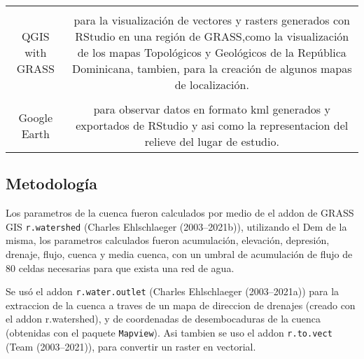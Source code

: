 \documentclass[11pt,]{article}
\begin{document}
\begin{longtable}[]{@{}cc@{}}
\begin{minipage}[t]{0.88\columnwidth}
\strut
\end{minipage}\tabularnewline
\begin{minipage}[t]{0.07\columnwidth}\centering\strut
QGIS with GRASS\strut
\end{minipage} & \begin{minipage}[t]{0.88\columnwidth}\centering\strut
para la visualización de vectores y rasters generados con RStudio en una
región de GRASS,como la visualización de los mapas Topológicos y
Geológicos de la República Dominicana, tambien, para la creación de
algunos mapas de localización.\strut
\end{minipage}\tabularnewline
\begin{minipage}[t]{0.07\columnwidth}\centering\strut
\strut
\end{minipage} & \begin{minipage}[t]{0.88\columnwidth}\centering\strut
\strut
\end{minipage}\tabularnewline
\begin{minipage}[t]{0.07\columnwidth}\centering\strut
Google Earth\strut
\end{minipage} & \begin{minipage}[t]{0.88\columnwidth}\centering\strut
para observar datos en formato kml generados y exportados de RStudio y
asi como la representacion del relieve del lugar de estudio.\strut
\end{minipage}\tabularnewline
\bottomrule
\end{longtable}

\subsection{Metodología}\label{metodologuxeda}

Los parametros de la cuenca fueron calculados por medio de el addon de
GRASS GIS \texttt{r.watershed} (Charles Ehlschlaeger (2003--2021b)),
utilizando el Dem de la misma, los parametros calculados fueron
acumulación, elevación, depresión, drenaje, flujo, cuenca y media
cuenca, con un umbral de acumulación de flujo de 80 celdas necesarias
para que exista una red de agua.

Se usó el addon \texttt{r.water.outlet} (Charles Ehlschlaeger
(2003--2021a)) para la extraccion de la cuenca a traves de un mapa de
direccion de drenajes (creado con el addon r.watershed), y de
coordenadas de desembocaduras de la cuenca (obtenidas con el paquete
\texttt{Mapview}). Asi tambien se uso el addon \texttt{r.to.vect} (Team
(2003--2021)), para convertir un raster en vectorial.
\end{document}
